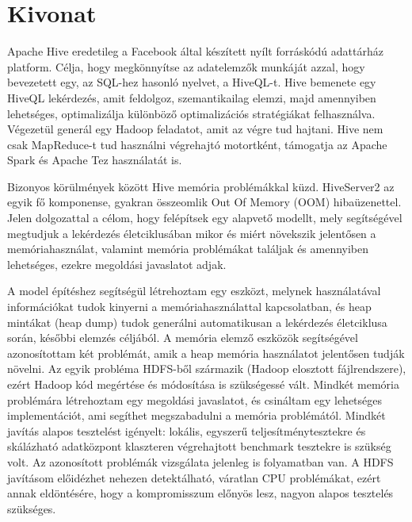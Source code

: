 \setcounter{page}{1}

\selecthungarian

\chapter*{Kivonat}

Apache Hive eredetileg a Facebook által készített nyílt forráskódú adattárház platform. Célja, hogy megkönnyítse az adatelemzők munkáját azzal, hogy bevezetett egy, az SQL-hez hasonló nyelvet, a HiveQL-t. Hive bemenete egy HiveQL lekérdezés, amit feldolgoz, szemantikailag elemzi, majd amennyiben lehetséges, optimalizálja különböző optimalizációs stratégiákat felhasználva. Végezetül generál egy Hadoop feladatot, amit az végre tud hajtani. Hive nem csak MapReduce-t tud használni végrehajtó motortként, támogatja az Apache Spark és Apache Tez használatát is. 

Bizonyos körülmények között Hive memória problémákkal küzd. HiveServer2 az egyik fő komponense, gyakran összeomlik Out Of Memory (OOM) hibaüzenettel. Jelen dolgozattal a célom, hogy felépítsek egy alapvető modellt, mely segítségével megtudjuk a lekérdezés életciklusában mikor és miért növekszik jelentősen a memóriahasználat, valamint memória problémákat találjak és amennyiben lehetséges, ezekre megoldási javaslatot adjak.

A model építéshez segítségül létrehoztam egy eszközt, melynek használatával információkat tudok kinyerni a memóriahasználattal kapcsolatban, és heap mintákat (heap dump) tudok generálni automatikusan a lekérdezés életciklusa során, későbbi elemzés céljából. A memória elemző eszközök segítségével azonosítottam két problémát, amik a heap memória használatot jelentősen tudják növelni. Az egyik probléma HDFS-ből származik (Hadoop elosztott fájlrendszere), ezért Hadoop kód megértése és módosítása is szükségessé vált. Mindkét memória problémára létrehoztam egy megoldási javaslatot, és csináltam egy lehetséges implementációt, ami segíthet megszabadulni a memória problémától. Mindkét javítás alapos tesztelést igényelt: lokális, egyszerű teljesítménytesztekre és skálázható adatközpont klaszteren végrehajtott benchmark tesztekre is szükség volt. Az azonosított problémák vizsgálata jelenleg is folyamatban van. A HDFS javításom előidézhet nehezen detektálható, váratlan CPU problémákat, ezért annak eldöntésére, hogy a kompromisszum előnyös lesz, nagyon alapos tesztelés szükséges.


